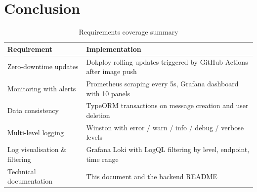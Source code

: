 \documentclass[12pt, a4paper]{article}
\begin{document}
\section{Conclusion}

\begin{table}[H]
    \centering
    \begin{tabular}{@{}p{7cm}p{7cm}@{}}
        \toprule
        \textbf{Requirement} & \textbf{Implementation} \\
        \midrule
        Zero-downtime updates & Dokploy rolling updates triggered by GitHub Actions after image push \\
        Monitoring with alerts & Prometheus scraping every 5s, Grafana dashboard with 10 panels \\
        Data consistency & TypeORM transactions on message creation and user deletion \\
        Multi-level logging & Winston with error / warn / info / debug / verbose levels \\
        Log visualisation \& filtering & Grafana Loki with LogQL filtering by level, endpoint, time range \\
        Technical documentation & This document and the backend README \\
        \bottomrule
    \end{tabular}
    \caption{Requirements coverage summary}
\end{table}
\end{document}
